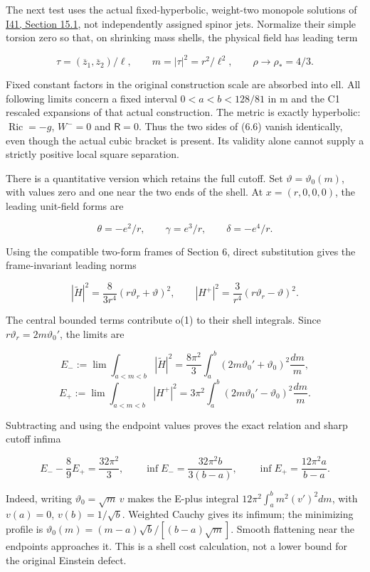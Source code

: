 \documentclass[
  10pt,
]{article}
\begin{document}
The next test uses the actual fixed-hyperbolic, weight-two monopole
solutions of \href{20260927_conformal_separation_and_zero_end.md}{I41,
Section 15.1}, not independently assigned spinor jets. Normalize their
simple torsion zero so that, on shrinking mass shells, the physical
field has leading term

\[
 \tau=(\overline z_1,\overline z_2)/\ell,
 \qquad m=|\tau|^2=r^2/\ell^2,
 \qquad \rho\longrightarrow\rho_*=4/3.
 \tag{7.1}
\]

Fixed constant factors in the original construction scale are absorbed
into ell. All following limits concern a fixed interval \(0<a<b<128/81\)
in m and the C1 rescaled expansions of that actual construction. The
metric is exactly hyperbolic: \(\operatorname{Ric}=-g\), \(W^-=0\) and
\(\mathsf R=0\). Thus the two sides of (6.6) vanish identically, even
though the actual cubic bracket is present. Its validity alone cannot
supply a strictly positive local square separation.

There is a quantitative version which retains the full cutoff. Set
\(\vartheta=\vartheta_0(m)\), with values zero and one near the two ends
of the shell. At \(x=(r,0,0,0)\), the leading unit-field forms are

\[
 \theta=-e^2/r,\qquad \gamma=e^3/r,\qquad\delta=-e^4/r.
\]

Using the compatible two-form frames of Section 6, direct substitution
gives the frame-invariant leading norms

\[
 |\widetilde H|^2=\frac{8}{3r^4}(r\vartheta_r+\vartheta)^2,
 \qquad |H^+|^2=\frac{3}{r^4}(r\vartheta_r-\vartheta)^2.
\]

The central bounded terms contribute o(1) to their shell integrals.
Since \(r\vartheta_r=2m\vartheta_0'\), the limits are

\[
 E_-:=\lim\int_{a<m<b}|\widetilde H|^2
   =\frac{8\pi^2}{3}\int_a^b(2m\vartheta_0'+\vartheta_0)^2\frac{dm}{m},
\] \[
 E_+:=\lim\int_{a<m<b}|H^+|^2
   =3\pi^2\int_a^b(2m\vartheta_0'-\vartheta_0)^2\frac{dm}{m}.
 \tag{7.2}
\]

Subtracting and using the endpoint values proves the exact relation and
sharp cutoff infima

\[
 E_- -\frac89 E_+=\frac{32\pi^2}{3},\qquad
 \inf E_-=\frac{32\pi^2b}{3(b-a)},\qquad
 \inf E_+=\frac{12\pi^2a}{b-a}. \tag{7.3}
\]

Indeed, writing \(\vartheta_0=\sqrt m\,v\) makes the E-plus integral
\(12\pi^2\int_a^b m^2(v')^2dm\), with \(v(a)=0\), \(v(b)=1/\sqrt b\).
Weighted Cauchy gives its infimum; the minimizing profile is
\(\vartheta_0(m)=(m-a)\sqrt b/[(b-a)\sqrt m]\). Smooth flattening near
the endpoints approaches it. This is a shell cost calculation, not a
lower bound for the original Einstein defect.
\end{document}
